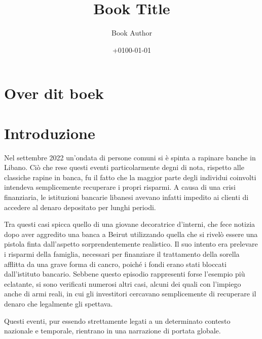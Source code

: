 \documentclass[
  a5paper,
  smalldemyvopaper,10pt,twoside,onecolumn,openright,extrafontsizes,hidelinks]{memoir}
\title{Book Title}
\author{Book Author}
\date{+0100-01-01}
\renewcommand*\contentsname{Indice}
\newcommand\contentsname{Indice}
\begin{document}
\frontmatter
\maketitle

\renewcommand*\contentsname{Inhoudsopgave}
{
\setcounter{tocdepth}{0}
\tableofcontents
}

\mainmatter
{}

\chapter*{Over dit boek}\label{over-dit-boek}



\chapter{Introduzione}\label{introduzione}

Nel settembre 2022 un'ondata di persone comuni si è spinta a rapinare
banche in Libano. Ciò che rese questi eventi particolarmente degni di
nota, rispetto alle classiche rapine in banca, fu il fatto che la
maggior parte degli individui coinvolti intendeva semplicemente
recuperare i propri risparmi. A causa di una crisi finanziaria, le
istituzioni bancarie libanesi avevano infatti impedito ai clienti di
accedere al denaro depositato per lunghi periodi.

Tra questi casi spicca quello di una giovane decoratrice d'interni, che
fece notizia dopo aver aggredito una banca a Beirut utilizzando quella
che si rivelò essere una pistola finta dall'aspetto sorprendentemente
realistico. Il suo intento era prelevare i risparmi della famiglia,
necessari per finanziare il trattamento della sorella afflitta da una
grave forma di cancro, poiché i fondi erano stati bloccati dall'istituto
bancario. Sebbene questo episodio rappresenti forse l'esempio più
eclatante, si sono verificati numerosi altri casi, alcuni dei quali con
l'impiego anche di armi reali, in cui gli investitori cercavano
semplicemente di recuperare il denaro che legalmente gli spettava.

Questi eventi, pur essendo strettamente legati a un determinato contesto
nazionale e temporale, rientrano in una narrazione di portata globale.
\end{document}
